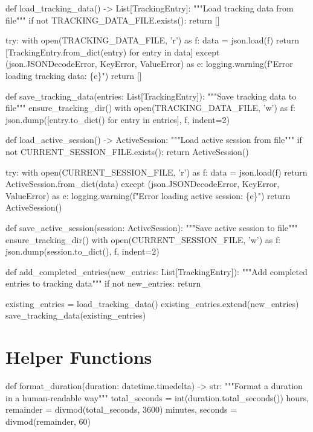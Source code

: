 def load_tracking_data() -> List[TrackingEntry]:
    """Load tracking data from file"""
    if not TRACKING_DATA_FILE.exists():
        return []
    
    try:
        with open(TRACKING_DATA_FILE, 'r') as f:
            data = json.load(f)
            return [TrackingEntry.from_dict(entry) for entry in data]
    except (json.JSONDecodeError, KeyError, ValueError) as e:
        logging.warning(f"Error loading tracking data: \{e\}")
        return []

def save_tracking_data(entries: List[TrackingEntry]):
    """Save tracking data to file"""
    ensure_tracking_dir()
    with open(TRACKING_DATA_FILE, 'w') as f:
        json.dump([entry.to_dict() for entry in entries], f, indent=2)

def load_active_session() -> ActiveSession:
    """Load active session from file"""
    if not CURRENT_SESSION_FILE.exists():
        return ActiveSession()
    
    try:
        with open(CURRENT_SESSION_FILE, 'r') as f:
            data = json.load(f)
            return ActiveSession.from_dict(data)
    except (json.JSONDecodeError, KeyError, ValueError) as e:
        logging.warning(f"Error loading active session: \{e\}")
        return ActiveSession()

def save_active_session(session: ActiveSession):
    """Save active session to file"""
    ensure_tracking_dir()
    with open(CURRENT_SESSION_FILE, 'w') as f:
        json.dump(session.to_dict(), f, indent=2)

def add_completed_entries(new_entries: List[TrackingEntry]):
    """Add completed entries to tracking data"""
    if not new_entries:
        return
        
    existing_entries = load_tracking_data()
    existing_entries.extend(new_entries)
    save_tracking_data(existing_entries)
\nwendcode{}\nwdocspar

\section{Helper Functions}

\nwenddocs{}\endmoddef\nwstartdeflinemarkup{}\nwenddeflinemarkup
def format_duration(duration: datetime.timedelta) -> str:
    """Format a duration in a human-readable way"""
    total_seconds = int(duration.total_seconds())
    hours, remainder = divmod(total_seconds, 3600)
    minutes, seconds = divmod(remainder, 60)
    
